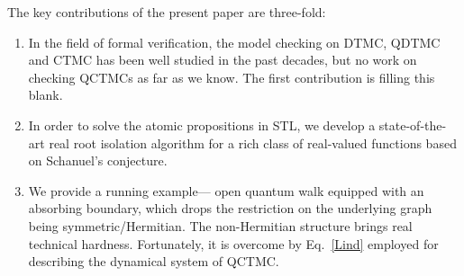 \documentclass[a4paper,UKenglish,cleveref,autoref,thm-restate,authorcolumns]{lipics-v2019}
\begin{document}
The key contributions of the present paper are three-fold:
\begin{enumerate}
	\item In the field of formal verification,
		the model checking on DTMC, QDTMC and CTMC has been well studied in the past decades,
		but no work on checking QCTMCs as far as we know.
		The first contribution is filling this blank.
	\item In order to solve the atomic propositions in STL,
		we develop a state-of-the-art real root isolation algorithm
		for a rich class of real-valued functions based on Schanuel's conjecture.
	\item We provide a running example---%
		open quantum walk equipped with an absorbing boundary,
		which drops the restriction on the underlying graph being symmetric/Hermitian.
		The non-Hermitian structure brings real technical hardness.
		Fortunately, it is overcome by Eq.~\eqref{Lind}
		employed for describing the dynamical system of QCTMC.
\end{enumerate}
 

\end{document}
